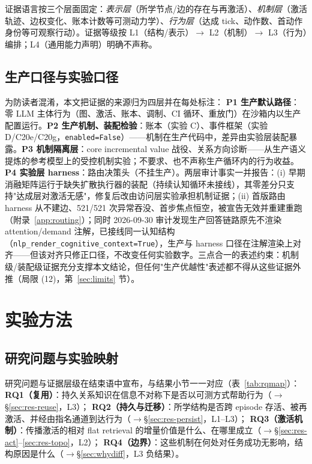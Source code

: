 \documentclass[10pt,a4paper]{ctexart}
\begin{document}
证据语言按三个层面固定：\emph{表示层}（所学节点/边的存在与再激活）、\emph{机制层}（激活轨迹、边权变化、账本计数等可测动力学）、\emph{行为层}（达成 tick、动作数、首动作身份等可观察行动）。证据等级按 L1（结构/表示）$\rightarrow$ L2（机制）$\rightarrow$ L3（行为）编排；L4（通用能力声明）明确不声称。

\subsection{生产口径与实验口径}
\label{sec:loop-prod}
为防读者混淆，本文把证据的来源归为四层并在每处标注：
\textbf{P1 生产默认路径}：零 LLM 主体行为（图、激活、账本、调制、CI 循环、重放门）在沙箱内以生产配置运行。\textbf{P2 生产机制、装配检验}：账本（实验 C）、事件框架（实验 D/C20e/C20g，\texttt{enabled=False}）——机制在生产代码中，差异由实验层装配暴露。\textbf{P3 机制隔离层}：core incremental value 战役、关系方向诊断——从生产语义提炼的参考模型上的受控机制实验；不要求、也不声称生产循环内的行为收益。\textbf{P4 实验层 harness}：路由决策头（不挂生产）。两层审计事实一并报告：(i) 早期消融矩阵运行于缺失扩散执行器的装配（持续认知循环未接线），其零差分只支持"达成层对激活无感"，修复后改由访问层实验承担机制证据；(ii) 首版路由 harness 从不建边、521/521 次异常吞没、首步焦点恒空，被宣告无效并重建重跑（附录~\ref{app:routing}）；同时 2026-09-30 审计发现生产回答链路原先不渲染 attention/demand 注解，已接线同一认知结构（\texttt{nlp\_render\_cognitive\_context=True}），生产与 harness 口径在注解渲染上对齐——但该对齐只修正口径，不改变任何实验数字。三点合一的表述约束：机制级/装配级证据充分支撑本文结论，但任何"生产优越性"表述都不得从这些证据外推（局限 (12)，第~\ref{sec:limits} 节）。

\section{实验方法}
\label{sec:method}

\subsection{研究问题与实验映射}
\label{sec:method-rq}
研究问题与证据层级在结束语中宣布，与结果小节一一对应（表~\ref{tab:rqmap}）：
\textbf{RQ1（复用）}：持久关系知识在信息不对称下是否以可测方式帮助行为（$\rightarrow$\S\ref{sec:res-reuse}，L3）；
\textbf{RQ2（持久与迁移）}：所学结构是否跨 episode 存活、被再激活、并经由指名通道到达行为（$\rightarrow$\S\ref{sec:res-persist}，L1--L3）；
\textbf{RQ3（激活机制）}：传播激活的相对 flat retrieval 的增量价值是什么、在哪里成立（$\rightarrow$\S\ref{sec:res-act}--\ref{sec:res-topo}，L2）；
\textbf{RQ4（边界）}：这些机制在何处对任务成功无影响，结构原因是什么（$\rightarrow$\S\ref{sec:whydiff}，L3 负结果）。
\end{document}
